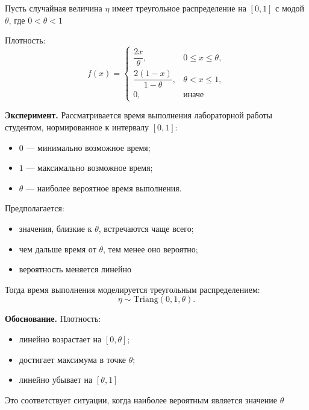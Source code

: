 \documentclass[12pt,a4paper]{article}
\theoremstyle{definition}
\begin{document}
Пусть случайная величина $\eta$ имеет треугольное распределение на $[0,1]$
с модой $\theta$, где $0<\theta<1$

Плотность:
\[
f(x)=
\begin{cases}
\dfrac{2x}{\theta}, & 0\le x\le \theta, \\[1ex]
\dfrac{2(1-x)}{1-\theta}, & \theta < x \le 1, \\[1ex]
0, & \text{иначе}
\end{cases}
\]

\textbf{Эксперимент.}
Рассматривается время выполнения лабораторной работы студентом, нормированное к интервалу $[0,1]$:
\begin{itemize}
    \item $0$ --- минимально возможное время;
    \item $1$ --- максимально возможное время;
    \item $\theta$ --- наиболее вероятное время выполнения.
\end{itemize}

Предполагается:
\begin{itemize}
    \item значения, близкие к $\theta$, встречаются чаще всего;
    \item чем дальше время от $\theta$, тем менее оно вероятно;
    \item вероятность меняется линейно
\end{itemize}

Тогда время выполнения моделируется треугольным распределением:
\[
\eta \sim \mathrm{Triang}(0,1,\theta).
\]

\textbf{Обоснование.}
Плотность:
\begin{itemize}
    \item линейно возрастает на $[0,\theta]$;
    \item достигает максимума в точке $\theta$;
    \item линейно убывает на $[\theta,1]$
\end{itemize}

Это соответствует ситуации, когда наиболее вероятным является значение $\theta$
\end{document}

